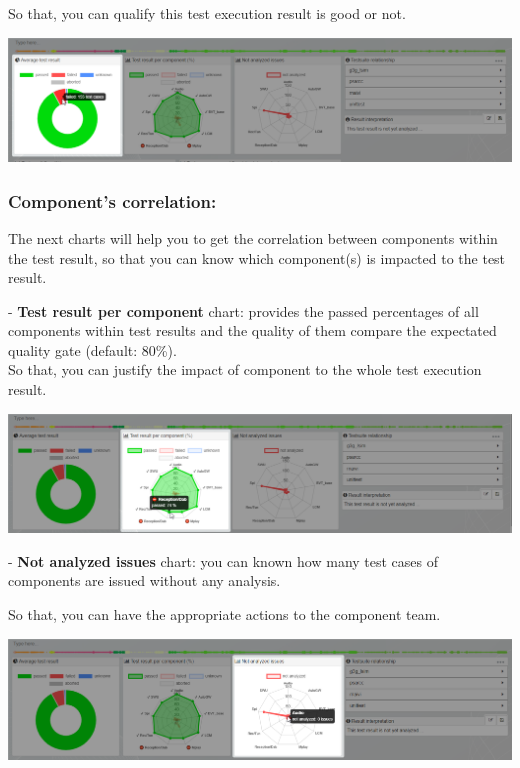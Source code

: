 So that, you can qualify this test execution result is good or not.

\includegraphics[width=1\linewidth]
{./pictures/dashboard/chart_average_test_result.png}

\subsubsection{Component's correlation:}
The next charts will help you to get the correlation between components within
the test result, so that you can know which component(s) is impacted to the test
result.

- \textbf{Test result per component} chart: provides the passed percentages of 
all components within test results and the quality of them compare the 
expectated quality gate (default: 80\%).\\
So that, you can justify the impact of component to the whole test execution
result.

\includegraphics[width=1\linewidth]
{./pictures/dashboard/chart_test_result_per_component.png}


- \textbf{Not analyzed issues} chart: you can known how many test cases of 
components are issued without any analysis. 

So that, you can have the appropriate actions to the component team.

\includegraphics[width=1\linewidth]
{./pictures/dashboard/chart_not_analyzed_issues.png}

